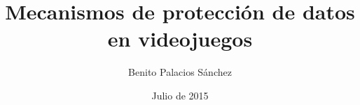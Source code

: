 \documentclass{beamer}
\title{Mecanismos de protección de datos en videojuegos}
\author{Benito Palacios Sánchez}
\institute
{Escuela Técnica Superior de Ingenierías Informática y Telecomunicación\\
  Universidad de Granada
}
\date{Julio de 2015}
\begin{document}
    \frame{\titlepage}
\end{document}
